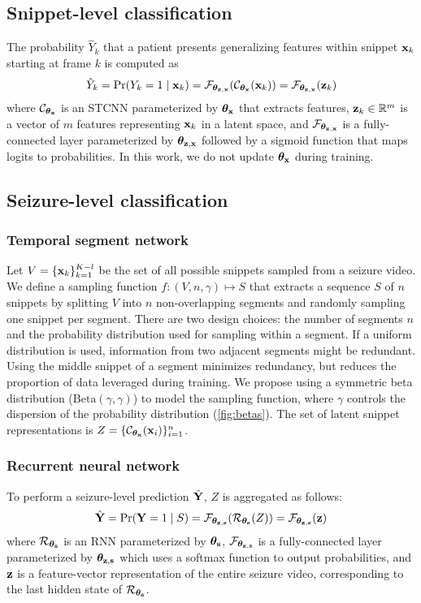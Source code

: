 \subsection{Snippet-level classification}
\label{sec:snippet-level}

The probability $\hat{Y}_k$ that a patient presents generalizing features within snippet $\mathbf{x}_k$ starting at frame $k$ is computed as
\begin{equation}
    \hat{Y}_k = \Pr(Y_k = 1 \mid \mathbf{x}_k) = \mathcal{F}_{\bm{\theta}_{\mathbf{z},\mathbf{x}}}( \mathcal{C}_{\bm{\theta}_{\mathbf{x}}}(\mathbf{x}_k) ) = \mathcal{F}_{\bm{\theta}_{\mathbf{z},\mathbf{x}}}( \mathbf{z}_k)
\end{equation}
where
$\mathcal{C}_{\bm{\theta}_{\mathbf{x}}}$ is an \ac{STCNN} parameterized by $\bm{\theta}_{\mathbf{x}}$ that extracts features,
$\mathbf{z}_k \in \mathbb{R} ^ m$ is a vector of $m$ features representing $\mathbf{x}_k$ in a latent space,
and
$\mathcal{F}_{\bm{\theta}_{\mathbf{z},\mathbf{x}}}$ is a fully-connected layer parameterized by $\bm{\theta}_{\mathbf{z},\mathbf{x}}$ followed by a sigmoid function that maps logits to probabilities.
In this work, we do not update $\bm{\theta}_{\mathbf{x}}$ during training.


\subsection{Seizure-level classification}
\label{sec:meth_seizure}

\subsubsection{Temporal segment network}
Let $V = \{ \mathbf{x}_k \}_{k=1}^{K-l}$ be the set of all possible snippets sampled from a seizure video.
We define a sampling function $f : (V, n, \gamma) \mapsto S$ that extracts a sequence $S$ of $n$ snippets by splitting $V$ into $n$ non-overlapping segments and randomly sampling one snippet per segment.
There are two design choices: the number of segments $n$ and the probability distribution used for sampling within a segment.
If a uniform distribution is used,
information from two adjacent segments might be redundant.
Using the middle snippet of a segment minimizes redundancy, but reduces the proportion of data leveraged during training.
We propose using a symmetric beta distribution ($\text{Beta}(\gamma, \gamma)$) to model the sampling function,
where $\gamma$ controls the dispersion of the probability distribution (\cref{fig:betas}).
The set of latent snippet representations is $Z = \{ \mathcal{C}_{\bm{\theta}_{\mathbf{x}}} (\mathbf{x}_i) \}_{i = 1}^{n}$.


\subsubsection{Recurrent neural network}

To perform a seizure-level prediction $\hat{\mathbf{Y}}$, $Z$ is aggregated as follows:
\begin{equation}
    \hat{\mathbf{Y}}
    = \Pr(\mathbf{Y} = 1 \mid S)
    = \mathcal{F}_{\bm{\theta}_{\mathbf{z},\mathbf{s}}}( \mathcal{R}_{\bm{\theta}_{\mathbf{s}}} ( Z ) )
    = \mathcal{F}_{\bm{\theta}_{\mathbf{z},\mathbf{s}}}( \mathbf{z} )
\end{equation}
where
$\mathcal{R}_{\bm{\theta}_{\mathbf{s}}}$ is an \ac{RNN} parameterized by $\bm{\theta}_{\mathbf{s}}$,
$\mathcal{F}_{\bm{\theta}_{\mathbf{z},\mathbf{s}}}$ is a fully-connected layer parameterized by $\bm{\theta}_{\mathbf{z},\mathbf{s}}$ which uses a softmax function to output probabilities,
and $\mathbf{z}$ is a feature-vector representation of the entire seizure video, corresponding to the last hidden state of $\mathcal{R}_{\bm{\theta}_{\mathbf{s}}}$.
